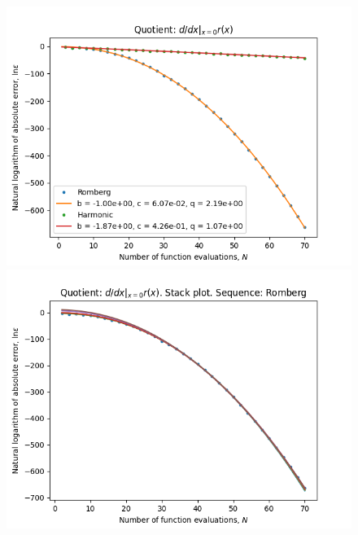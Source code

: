 \begin{figure}[H]
\centering
\begin{minipage}{0.45\textwidth}
\centering
\includegraphics[scale=0.45]{../results/diff_quot_plots/rho_hp_trend.png}
\end{minipage}
\begin{minipage}{0.45\textwidth}
\centering
\includegraphics[scale=0.45]{../results/diff_quot_plots/rho_hp_romberg_stack.png}
\end{minipage}
\end{figure}

